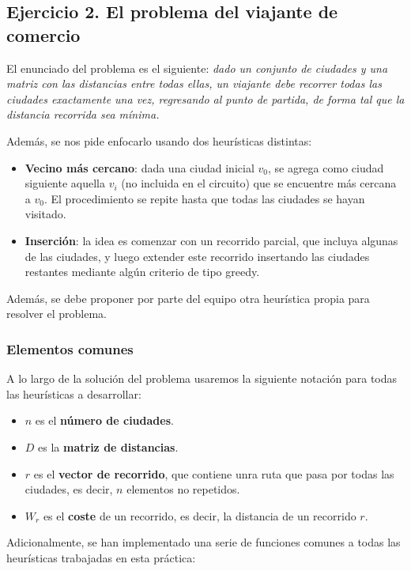 \documentclass[10pt,a4paper]{article}
\begin{document}
\subsection{Ejercicio 2. El problema del viajante de comercio}

El enunciado del problema es el siguiente: \textit{dado un conjunto de ciudades y una matriz con las distancias entre todas ellas, un viajante debe recorrer todas las ciudades exactamente una vez, regresando al punto de partida, de forma tal que la distancia recorrida sea mínima.}

Además, se nos pide enfocarlo usando dos heurísticas distintas:
\begin{itemize}
	\item \textbf{Vecino más cercano}: dada una ciudad inicial \(v_0\), se agrega como ciudad siguiente aquella \(v_i\) (no incluida en el circuito) que se encuentre más cercana a \(v_0\). El procedimiento se repite hasta que todas las ciudades se hayan visitado.
	\item \textbf{Inserción}: la idea es comenzar con un recorrido parcial, que incluya algunas de las ciudades, y luego extender este recorrido insertando las ciudades restantes mediante algún criterio de tipo greedy.
\end{itemize}

Además, se debe proponer por parte del equipo otra heurística propia para resolver el problema.

\subsubsection*{Elementos comunes}
A lo largo de la solución del problema usaremos la siguiente notación para todas las heurísticas a desarrollar:
\begin{itemize}
	\item \(n\) es el \textbf{número de ciudades}.
	\item \(D\) es la \textbf{matriz de distancias}.
	\item \(r\) es el \textbf{vector de recorrido}, que contiene unra ruta que pasa por todas las ciudades, es decir, \(n\) elementos no repetidos.
	\item \(W_r\) es el \textbf{coste} de un recorrido, es decir, la distancia de un recorrido \(r\).
\end{itemize}

Adicionalmente, se han implementado una serie de funciones comunes a todas las heurísticas trabajadas en esta práctica:
\end{document}
